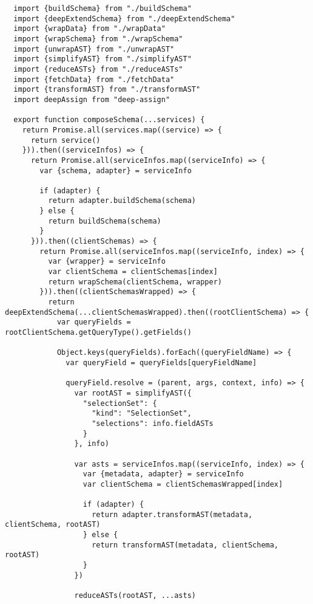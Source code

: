 \begin{verbatim}
  import {buildSchema} from "./buildSchema"
  import {deepExtendSchema} from "./deepExtendSchema"
  import {wrapData} from "./wrapData"
  import {wrapSchema} from "./wrapSchema"
  import {unwrapAST} from "./unwrapAST"
  import {simplifyAST} from "./simplifyAST"
  import {reduceASTs} from "./reduceASTs"
  import {fetchData} from "./fetchData"
  import {transformAST} from "./transformAST"
  import deepAssign from "deep-assign"

  export function composeSchema(...services) {
    return Promise.all(services.map((service) => {
      return service()
    })).then((serviceInfos) => {
      return Promise.all(serviceInfos.map((serviceInfo) => {
        var {schema, adapter} = serviceInfo

        if (adapter) {
          return adapter.buildSchema(schema)
        } else {
          return buildSchema(schema)
        }
      })).then((clientSchemas) => {
        return Promise.all(serviceInfos.map((serviceInfo, index) => {
          var {wrapper} = serviceInfo
          var clientSchema = clientSchemas[index]
          return wrapSchema(clientSchema, wrapper)
        })).then((clientSchemasWrapped) => {
          return deepExtendSchema(...clientSchemasWrapped).then((rootClientSchema) => {
            var queryFields = rootClientSchema.getQueryType().getFields()

            Object.keys(queryFields).forEach((queryFieldName) => {
              var queryField = queryFields[queryFieldName]

              queryField.resolve = (parent, args, context, info) => {
                var rootAST = simplifyAST({
                  "selectionSet": {
                    "kind": "SelectionSet",
                    "selections": info.fieldASTs
                  }
                }, info)

                var asts = serviceInfos.map((serviceInfo, index) => {
                  var {metadata, adapter} = serviceInfo
                  var clientSchema = clientSchemasWrapped[index]

                  if (adapter) {
                    return adapter.transformAST(metadata, clientSchema, rootAST)
                  } else {
                    return transformAST(metadata, clientSchema, rootAST)
                  }
                })

                reduceASTs(rootAST, ...asts)


\end{verbatim}
